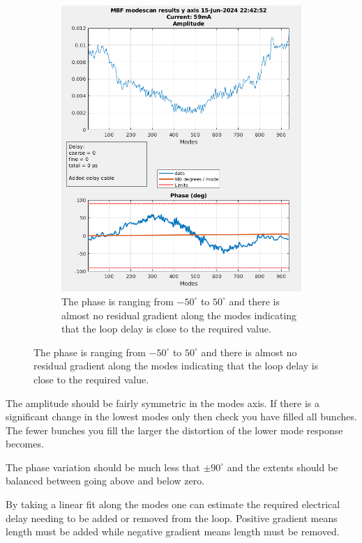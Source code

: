 \documentclass{report}
\begin{document}
\begin{figure}[hbt]
\begin{subfigure}[b]{0.48\textwidth}
        \includegraphics[width=\textwidth]{modescan_y.png}
        \caption{The phase is ranging from $-50^\circ$ to $50^\circ$ and there is almost no residual gradient along the modes indicating that the loop delay is close to the required value.}
        \label{fig:example_modescan_y}
    \end{subfigure}
\end{figure}

 
The amplitude should be fairly symmetric in the modes axis. If there is a significant change in the lowest modes only then check you have filled all bunches. The fewer bunches you fill the larger the distortion of the lower mode response becomes. 

The phase variation should be much less that $\pm90^\circ$ and the extents should be balanced between going above and below zero.

By taking a linear fit along the modes one can estimate the required electrical delay needing to be added or removed from the loop. Positive gradient means length must be added while negative gradient means length must be removed.
\end{document}

